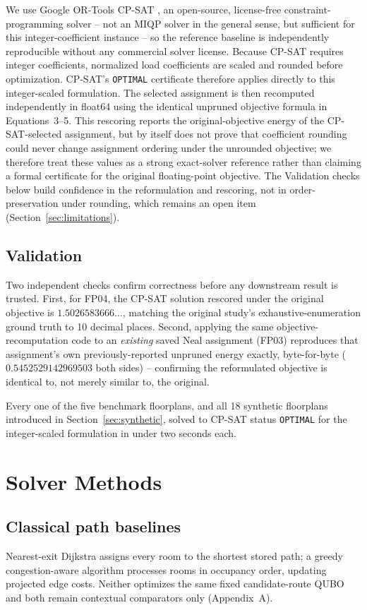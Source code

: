 \documentclass[11pt]{article}
\begin{document}
We use Google OR-Tools CP-SAT \cite{ortools}, an open-source, license-free constraint-programming solver -- not an MIQP solver in the general sense, but sufficient for this integer-coefficient instance -- so the reference baseline is independently reproducible without any commercial solver license. Because CP-SAT requires integer coefficients, normalized load coefficients are scaled and rounded before optimization. CP-SAT's \texttt{OPTIMAL} certificate therefore applies directly to this integer-scaled formulation. The selected assignment is then recomputed independently in float64 using the identical unpruned objective formula in Equations~3--5. This rescoring reports the original-objective energy of the CP-SAT-selected assignment, but by itself does not prove that coefficient rounding could never change assignment ordering under the unrounded objective; we therefore treat these values as a strong exact-solver reference rather than claiming a formal certificate for the original floating-point objective. The Validation checks below build confidence in the reformulation and rescoring, not in order-preservation under rounding, which remains an open item (Section~\ref{sec:limitations}).

\subsection{Validation}
Two independent checks confirm correctness before any downstream result is trusted. First, for FP04, the CP-SAT solution rescored under the original objective is $1.5026583666\ldots$, matching the original study's exhaustive-enumeration ground truth to 10 decimal places. Second, applying the same objective-recomputation code to an \emph{existing} saved Neal assignment (FP03) reproduces that assignment's own previously-reported unpruned energy exactly, byte-for-byte ($0.5452529142969503$ both sides) -- confirming the reformulated objective is identical to, not merely similar to, the original.

Every one of the five benchmark floorplans, and all 18 synthetic floorplans introduced in Section~\ref{sec:synthetic}, solved to CP-SAT status \texttt{OPTIMAL} for the integer-scaled formulation in under two seconds each.

\section{Solver Methods}

\subsection{Classical path baselines}
Nearest-exit Dijkstra assigns every room to the shortest stored path; a greedy congestion-aware algorithm processes rooms in occupancy order, updating projected edge costs. Neither optimizes the same fixed candidate-route QUBO and both remain contextual comparators only (Appendix~A).
\end{document}
